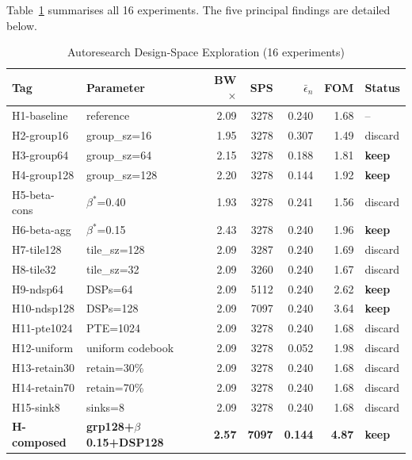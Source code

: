 \documentclass[conference]{IEEEtran}
\begin{document}
Table~\ref{tab:dse} summarises all 16 experiments. The five principal
findings are detailed below.

\begin{table}[t]
\caption{Autoresearch Design-Space Exploration (16 experiments)}
\label{tab:dse}
\centering\small
\setlength{\tabcolsep}{4pt}
\begin{tabular}{llrrrrl}
\toprule
Tag & Parameter & BW$\times$ & SPS & $\bar\epsilon_n$ & FOM & Status \\
\midrule
H1-baseline  & reference           & 2.09 & 3278 & 0.240 & 1.68 & -- \\
\midrule
H2-group16   & group\_sz=16        & 1.95 & 3278 & 0.307 & 1.49 & discard \\
H3-group64   & group\_sz=64        & 2.15 & 3278 & 0.188 & 1.81 & \textbf{keep} \\
H4-group128  & group\_sz=128       & 2.20 & 3278 & 0.144 & 1.92 & \textbf{keep} \\
\midrule
H5-beta-cons & $\beta^*$=0.40      & 1.93 & 3278 & 0.241 & 1.56 & discard \\
H6-beta-agg  & $\beta^*$=0.15      & 2.43 & 3278 & 0.240 & 1.96 & \textbf{keep} \\
\midrule
H7-tile128   & tile\_sz=128        & 2.09 & 3287 & 0.240 & 1.69 & discard \\
H8-tile32    & tile\_sz=32         & 2.09 & 3260 & 0.240 & 1.67 & discard \\
\midrule
H9-ndsp64    & DSPs=64             & 2.09 & 5112 & 0.240 & 2.62 & \textbf{keep} \\
H10-ndsp128  & DSPs=128            & 2.09 & 7097 & 0.240 & 3.64 & \textbf{keep} \\
\midrule
H11-pte1024  & PTE=1024            & 2.09 & 3278 & 0.240 & 1.68 & discard \\
H12-uniform  & uniform codebook    & 2.09 & 3278 & 0.052 & 1.98 & discard \\
H13-retain30 & retain=30\%         & 2.09 & 3278 & 0.240 & 1.68 & discard \\
H14-retain70 & retain=70\%         & 2.09 & 3278 & 0.240 & 1.68 & discard \\
H15-sink8    & sinks=8             & 2.09 & 3278 & 0.240 & 1.68 & discard \\
\midrule
\textbf{H-composed} & \textbf{grp128+$\beta$0.15+DSP128} & \textbf{2.57} & \textbf{7097} & \textbf{0.144} & \textbf{4.87} & \textbf{keep} \\
\bottomrule
\end{tabular}
\end{table}
\end{document}
